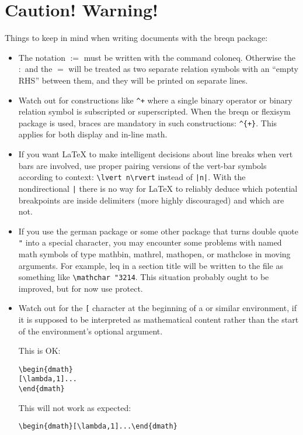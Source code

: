 \documentclass{article}
\def\latex/{{\protect\LaTeX}}
\newcommand{\ntt}{\normalfont\ttfamily}
\DeclareRobustCommand{\cs}[1]{{\ntt\ttbackslash#1}}
\let\cn=\cs
\DeclareRobustCommand{\pkg}[1]{{\ntt#1}}
\newcommand\thepkg[1]{the \pkg{breqn} package}
\providecommand{\qq}[1]{\textquotedblleft#1\textquotedblright}
\begin{document}
\section{Caution! Warning!}
Things to keep in mind when writing documents with \thepkg/:
\begin{itemize}

\item The notation $:=$ must be written with the command \cs{coloneq}.
  Otherwise the $:$ and the $=$ will be treated as two separate relation
  symbols with an \qq{empty RHS} between them, and they will be printed
  on separate lines.

\item Watch out for constructions like \verb'^+' where a single binary
operator or binary relation symbol is subscripted or superscripted. When
the \pkg{breqn} or \pkg{flexisym} package is used, braces are mandatory
in such constructions: \verb'^{+}'. This applies for both display and
in-line math.

\item If you want \latex/ to make intelligent decisions about line
breaks when vert bars are involved, use proper pairing versions of the
vert-bar symbols according to context: \verb'\lvert n\rvert' instead of
\verb'|n|'. With the nondirectional \verb'|' there is no way for \latex/
to reliably deduce which potential breakpoints are inside delimiters
(more highly discouraged) and which are not.

\item If you use the \pkg{german} package or some other package that
turns double quote \verb'"' into a special character, you may encounter
some problems with named math symbols of type mathbin, mathrel,
mathopen, or mathclose in moving arguments. For example, \cn{leq} in a
section title will be written to the  file as something like
\verb'\mathchar "3214'. This situation probably ought to be improved,
but for now use \cn{protect}.

\item Watch out for the \texttt{[} character at the beginning of a
 or similar environment, if it is supposed to be interpreted
as mathematical content rather than the start of the environment's
optional argument.

This is OK:
\begin{verbatim}
\begin{dmath}
[\lambda,1]...
\end{dmath}
\end{verbatim}
This will not work as expected:
\begin{verbatim}
\begin{dmath}[\lambda,1]...\end{dmath}
\end{verbatim}


\end{itemize}
\end{document}
